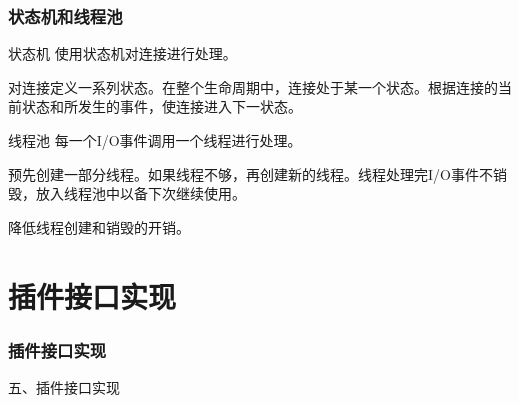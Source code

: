 \documentclass[10pt,dvipdfm]{beamer}
\begin{document}
\begin{frame}
	\frametitle{状态机和线程池}
	\begin{block}{状态机}
	使用状态机对连接进行处理。
	
	对连接定义一系列状态。在整个生命周期中，连接处于某一个状态。根据连接的当前状态和所发生的事件，使连接进入下一状态。
	\end{block}
	\pause
	\begin{block}{线程池}
	每一个I/O事件调用一个线程进行处理。
	
	预先创建一部分线程。如果线程不够，再创建新的线程。线程处理完I/O事件不销毁，放入线程池中以备下次继续使用。
	
	降低线程创建和销毁的开销。
	\end{block}
\end{frame}

\section{插件接口实现}

\begin{frame}
	\frametitle{插件接口实现}
	\begin{center}
	{\Large
		五、插件接口实现
	}
	\end{center}
\end{frame}

\end{document}
